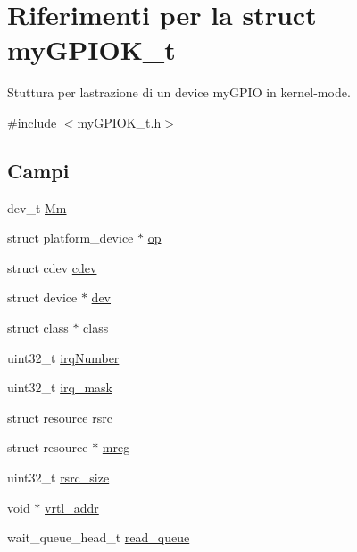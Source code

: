 \hypertarget{structmy_g_p_i_o_k__t}{}\section{Riferimenti per la struct my\+G\+P\+I\+O\+K\+\_\+t}
\label{structmy_g_p_i_o_k__t}


Stuttura per l\textquotesingle{}astrazione di un device my\+G\+P\+IO in kernel-\/mode.  




{\ttfamily \#include $<$my\+G\+P\+I\+O\+K\+\_\+t.\+h$>$}

\subsection*{Campi}
\begin{DoxyCompactItemize}
\item 
dev\+\_\+t \hyperlink{structmy_g_p_i_o_k__t_aeb60fb4e41b5f11f70ebe969361884f4}{Mm}
\item 
struct platform\+\_\+device $\ast$ \hyperlink{structmy_g_p_i_o_k__t_a3a7801058bef8fbe4a2cec3c9579cd70}{op}
\item 
struct cdev \hyperlink{structmy_g_p_i_o_k__t_acba682fe45d5a1501790dbdb1d99bd6a}{cdev}
\item 
struct device $\ast$ \hyperlink{structmy_g_p_i_o_k__t_acf6a82c73e7a9d99293d9ce0b8837faf}{dev}
\item 
struct class $\ast$ \hyperlink{structmy_g_p_i_o_k__t_a9b6474dd18270738a5c4853fd93b5e70}{class}
\item 
uint32\+\_\+t \hyperlink{structmy_g_p_i_o_k__t_a42a1593ebe61611c4e29413903a373a5}{irq\+Number}
\item 
uint32\+\_\+t \hyperlink{structmy_g_p_i_o_k__t_a8ee102d0534084ca58a9cf9b8a3d9cc9}{irq\+\_\+mask}
\item 
struct resource \hyperlink{structmy_g_p_i_o_k__t_a565a1848c3ae8026257a74cf169c6941}{rsrc}
\item 
struct resource $\ast$ \hyperlink{structmy_g_p_i_o_k__t_a18c4eb95350c67ccb239a8a39c43c09a}{mreg}
\item 
uint32\+\_\+t \hyperlink{structmy_g_p_i_o_k__t_a0f87b53dc5049a349ef01aa586c0b5dc}{rsrc\+\_\+size}
\item 
void $\ast$ \hyperlink{structmy_g_p_i_o_k__t_af5aef493b3c2bc9d1f036ce0acea9bba}{vrtl\+\_\+addr}
\item 
wait\+\_\+queue\+\_\+head\+\_\+t \hyperlink{structmy_g_p_i_o_k__t_a251570f8e6976ad87411093e330e7b4f}{read\+\_\+queue}

\end{DoxyCompactItemize}
